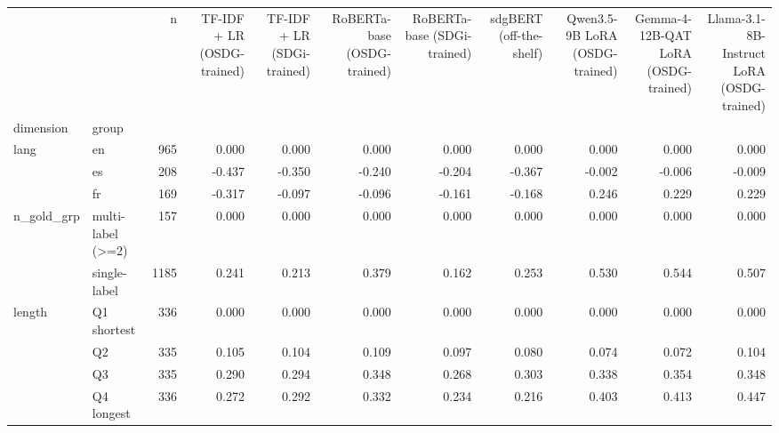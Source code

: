 \begin{tabular}{llrrrrrrrrr}
\toprule
 &  & n & TF-IDF + LR (OSDG-trained) & TF-IDF + LR (SDGi-trained) & RoBERTa-base (OSDG-trained) & RoBERTa-base (SDGi-trained) & sdgBERT (off-the-shelf) & Qwen3.5-9B LoRA (OSDG-trained) & Gemma-4-12B-QAT LoRA (OSDG-trained) & Llama-3.1-8B-Instruct LoRA (OSDG-trained) \\
dimension & group &  &  &  &  &  &  &  &  &  \\
\midrule
\multirow[t]{3}{*}{lang} & en & 965 & 0.000 & 0.000 & 0.000 & 0.000 & 0.000 & 0.000 & 0.000 & 0.000 \\
 & es & 208 & -0.437 & -0.350 & -0.240 & -0.204 & -0.367 & -0.002 & -0.006 & -0.009 \\
 & fr & 169 & -0.317 & -0.097 & -0.096 & -0.161 & -0.168 & 0.246 & 0.229 & 0.229 \\
\cline{1-11}
\multirow[t]{2}{*}{n_gold_grp} & multi-label (>=2) & 157 & 0.000 & 0.000 & 0.000 & 0.000 & 0.000 & 0.000 & 0.000 & 0.000 \\
 & single-label & 1185 & 0.241 & 0.213 & 0.379 & 0.162 & 0.253 & 0.530 & 0.544 & 0.507 \\
\cline{1-11}
\multirow[t]{4}{*}{length} & Q1 shortest & 336 & 0.000 & 0.000 & 0.000 & 0.000 & 0.000 & 0.000 & 0.000 & 0.000 \\
 & Q2 & 335 & 0.105 & 0.104 & 0.109 & 0.097 & 0.080 & 0.074 & 0.072 & 0.104 \\
 & Q3 & 335 & 0.290 & 0.294 & 0.348 & 0.268 & 0.303 & 0.338 & 0.354 & 0.348 \\
 & Q4 longest & 336 & 0.272 & 0.292 & 0.332 & 0.234 & 0.216 & 0.403 & 0.413 & 0.447 \\
\cline{1-11}
\bottomrule
\end{tabular}
